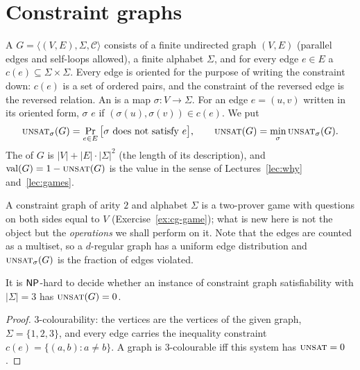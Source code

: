 \section{Constraint graphs}
\label{sec:cg}

\begin{definition}\label{def:cg6}
A  $G=\langle(V,E),\Sigma,\mathcal C\rangle$ consists of a finite undirected graph $(V,E)$ (parallel edges and self-loops allowed), a finite alphabet $\Sigma$, and for every edge $e\in E$ a  $c(e)\subseteq\Sigma\times\Sigma$.
Every edge is oriented for the purpose of writing the constraint down: $c(e)$ is a set of ordered pairs, and the constraint of the reversed edge is the reversed relation.
An  is a map $\sigma\colon V\to\Sigma$.  For an edge $e=(u,v)$ written in its oriented form, $\sigma$  $e$ if $(\sigma(u),\sigma(v))\in c(e)$.  We put
\[
  \textsc{unsat}_\sigma(G)=\Pr_{e\in E}\big[\sigma\text{ does not satisfy }e\big],\qquad
  \textsc{unsat}(G)=\min_\sigma\textsc{unsat}_\sigma(G).
\]
The  of $G$ is $|V|+|E|\cdot|\Sigma|^2$ (the length of its description), and $\operatorname{val}(G)=1-\textsc{unsat}(G)$ is the value in the sense of Lectures~\ref{lec:why} and~\ref{lec:games}.
\end{definition}

\noindent
A constraint graph of arity $2$ and alphabet $\Sigma$ is a two-prover game with questions on both sides equal to $V$ (Exercise~\ref{ex:cg-game}); what is new here is not the object but the \emph{operations} we shall perform on it.
Note that the edges are counted as a multiset, so a $d$-regular graph has a uniform edge distribution and $\textsc{unsat}_\sigma(G)$ is the fraction of edges violated.

\begin{proposition}\label{prop:np-cg}
It is $\mathsf{NP}$-hard to decide whether an instance of constraint graph satisfiability with $|\Sigma|=3$ has $\textsc{unsat}(G)=0$.
\end{proposition}
\begin{proof}
$3$-colourability: the vertices are the vertices of the given graph, $\Sigma=\{1,2,3\}$, and every edge carries the inequality constraint $c(e)=\{(a,b):a\ne b\}$.
A graph is $3$-colourable iff this system has $\textsc{unsat}=0$.
\end{proof}

